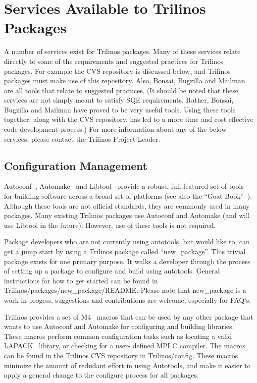 \documentclass[12pt,relax]{SANDreport}
\begin{document}
	\section{Services Available to Trilinos Packages}
	A number of services exist for Trilinos packages.  Many of these 
services relate directly to some of the requirements and suggested practices 
for Trilinos packages.  For example the CVS repository is discussed below, and 
Trilinos packages must make use of this repository.  Also, Bonsai, Bugzilla 
and Mailman are all tools that relate to suggested practices.  (It should be 
noted that these services are not simply meant to satisfy SQE requirements.  
Rather, Bonsai, Bugzilla and Mailman have proved to be very useful tools.  
Using these tools together, along with the CVS repository, has led to a more 
time and cost effective code development process.)  For more information about 
any of the below services, please contact the Trilinos Project Leader.

	\subsection{Configuration Management}
Autoconf~\cite{Autoconf},  Automake~\cite{Automake} and Libtool~\cite{Libtool} 
provide a robust, full-featured set of tools for building software across a 
broad set of platforms (see also the ``Goat Book''~\cite{GoatBook}).  Although 
these tools are not official standards, they are commonly used in many 
packages.  Many existing Trilinos packages use Autoconf and Automake (and will 
use Libtool in the future).  However, use of these tools is not required.

Package developers who are not currently using autotools, but would like
to, can get a jump start by using a Trilinos package called 
``new\_package''.  This trivial package exists for one primary purpose.  
It walks a developer through the process of setting up a package to 
configure and build using autotools.  General instructions for how to get 
started can be found in Trilinos/packages/new\_package/README.  Please note 
that new\_package is a work in progess, suggestions and contributions are 
welcome, especially for FAQ's.

Trilinos provides a set of M4~\cite{M4} macros that can be used by any other
package that wants to use Autoconf and Automake for configuring and
building libraries.  These macros perform common configuration tasks such as
locating a valid LAPACK~\cite{lapack} library, or checking for a user-
defined MPI C compiler.  The macros can be found in the Trilinos CVS 
repository in Trilinos/config.  These macros minimize the amount of redudant
 effort in using Autotools, and make it easier to apply a general change to 
the configure process for all packages.
\end{document}
